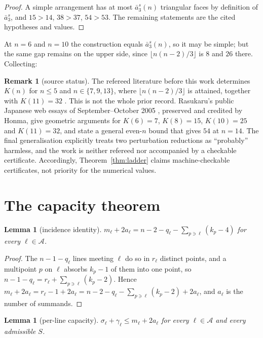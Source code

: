 \documentclass[11pt]{article}
\newtheorem{lemma}[theorem]{Lemma}
\theoremstyle{definition}
\newtheorem{remark}[theorem]{Remark}
\begin{document}
\begin{proof}
A simple arrangement has at most $\bar a_3^s(n)$ triangular faces by
definition of $\bar a_3^s$, and $15>14$, $38>37$, $54>53$. The remaining
statements are the cited hypotheses and values.
\end{proof}

At $n=6$ and $n=10$ the construction equals $\bar a_3^s(n)$, so it may be
simple; but the same gap remains on the upper side, since
$\lfloor n(n-2)/3\rfloor$ is $8$ and $26$ there. Collecting:

\begin{remark}[source status]\label{rem:priorweb}
The refereed literature before this work determines $K(n)$ for $n\le5$ and
$n\in\{7,9,13\}$, where $\lfloor n(n-2)/3\rfloor$ is attained, together
with $K(11)=32$ \cite{Savchuk}. This is not the whole prior record.
Rasukaru's public Japanese web essays of September--October 2005
\cite{Rasukaru2005}, preserved and credited by Honma, give geometric
arguments for $K(6)=7$, $K(8)=15$, $K(10)=25$ and $K(11)=32$, and state a
general even-$n$ bound that gives $54$ at $n=14$. The final generalisation
explicitly treats two perturbation reductions as ``probably'' harmless, and
the work is neither refereed nor accompanied by a checkable certificate.
Accordingly, Theorem~\ref{thm:ladder} claims machine-checkable certificates,
not priority for the numerical values.
\end{remark}

\section{The capacity theorem}

\begin{lemma}[incidence identity]\label{lem:identity}
$m_\ell+2a_\ell = n-2-q_\ell-\sum_{p\ni\ell}(k_p-4)$ for every
$\ell\in\mathcal A$.
\end{lemma}

\begin{proof}
The $n-1-q_\ell$ lines meeting $\ell$ do so in $r_\ell$ distinct points, and a
multipoint $p$ on $\ell$ absorbs $k_p-1$ of them into one point, so
$n-1-q_\ell=r_\ell+\sum_{p\ni\ell}(k_p-2)$. Hence
$m_\ell+2a_\ell=r_\ell-1+2a_\ell=n-2-q_\ell-\sum_{p\ni\ell}(k_p-2)+2a_\ell$,
and $a_\ell$ is the number of summands.
\end{proof}

\begin{lemma}[per-line capacity]\label{lem:perline}
$\sigma_\ell+\gamma_\ell\le m_\ell+2a_\ell$ for every $\ell\in\mathcal A$ and
every admissible $S$.
\end{lemma}
\end{document}
